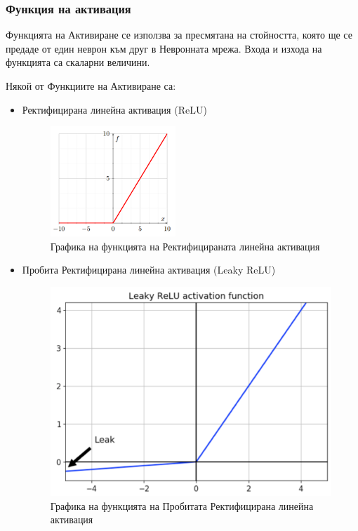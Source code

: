 \documentclass{article}
\begin{document}
    \subsubsection{Функция на активация}

    Функцията на Активиране се използва за пресмятана на стойността, която ще се предаде от един неврон към друг в
    Невронната мрежа. Входа и изхода на функцията са скаларни величини. \cite{deep-learning-practitioner}

    Някой от Функциите на Активиране са:

    \begin{itemize}
        \item Ректифицирана линейна активация (ReLU)

        \begin{figure}[H]
            \centering
            \captionsetup{justification=centering}
            \includegraphics{chapter-03/relu.png}
            \caption{Графика на функцията на Ректифицираната линейна активация}
        \end{figure}

        \item Пробита Ректифицирана линейна активация (Leaky ReLU)

        \begin{figure}[H]
            \centering
            \captionsetup{justification=centering}
            \includegraphics{chapter-03/leaky-relu.png}
            \caption{Графика на функцията на Пробитата Ректифицирана линейна активация}
        \end{figure}


\end{itemize}
\end{document}

